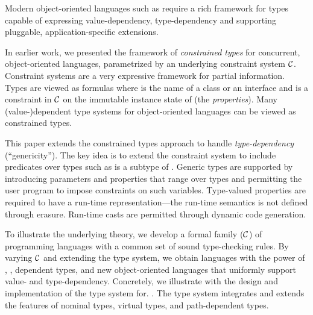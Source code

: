Modern object-oriented languages such as \Xten{} require a rich
framework for types capable of expressing value-dependency,
type-dependency and supporting pluggable, application-specific
extensions.

In earlier work, we presented the framework of \emph{constrained types}
for concurrent, object-oriented languages, parametrized by an
underlying constraint system $\cal C$. Constraint systems are a very
expressive framework for partial information. Types are viewed as
formulas  where  is the name of a class or an interface
and
 is a constraint in $\cal C$ on the immutable instance state of
 (the \emph{properties}). Many (value-)dependent type systems
for object-oriented languages can be viewed as constrained types.

This paper extends the constrained types approach to handle
\emph{type-dependency} (``genericity''). The key idea is to extend
the constraint system to include predicates over types
such as  is a subtype of .  Generic types are supported
by introducing parameters and properties that range over types and
permitting the user program to impose constraints on such
variables. Type-valued properties are required to have a run-time
representation---the run-time semantics is not defined through
erasure. Run-time casts are permitted through dynamic code generation.

To illustrate the underlying theory, we develop a formal family
\FX(${\cal C}$) of programming languages with a common set of sound
type-checking rules.  By varying $\cal C$ and extending the type system,
we obtain languages with
the power of \FJ, \FGJ, dependent types,
and new object-oriented languages that
uniformly support value- and type-dependency.  Concretely, we
illustrate with the design and implementation of the type system for.
\Xten{}.  The type system integrates and extends the features of
nominal types, virtual types, and path-dependent
types.
